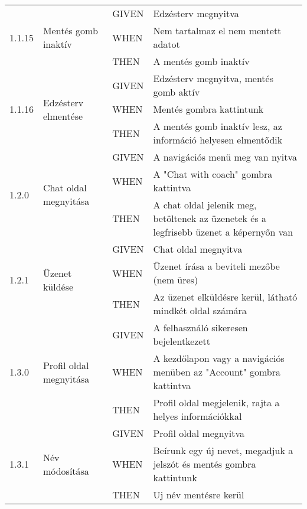 \begin{center}
\begin{longtable}{ | p{} | p{} | p{} | p{} | }
			\multirow{3}{*}{1.1.15} 
			& \multirow{3}{=}{Mentés gomb inaktív} 
			& GIVEN 
			& Edzésterv megnyitva \\
			\cline{3-4}
			& & WHEN 
			& Nem tartalmaz el nem mentett adatot \\
			\cline{3-4}
			& & THEN 
			& A mentés gomb inaktív \\
			\hline

			\multirow{3}{*}{1.1.16} 
			& \multirow{3}{=}{Edzésterv elmentése} 
			& GIVEN 
			& Edzésterv megnyitva, mentés gomb aktív \\
			\cline{3-4}
			& & WHEN 
			& Mentés gombra kattintunk \\
			\cline{3-4}
			& & THEN 
			& A mentés gomb inaktív lesz, az információ helyesen elmentődik \\
			\hline



			\multirow{3}{*}{1.2.0} 
			& \multirow{3}{=}{Chat oldal megnyitása} 
			& GIVEN 
			& A navigációs menü meg van nyitva \\
			\cline{3-4}
			& & WHEN 
			& A "Chat with coach" gombra kattintva \\
			\cline{3-4}
			& & THEN 
			& A chat oldal jelenik meg, betöltenek az üzenetek és a legfrisebb üzenet a képernyőn van \\
			\hline

			\multirow{3}{*}{1.2.1} 
			& \multirow{3}{=}{Üzenet küldése} 
			& GIVEN 
			& Chat oldal megnyitva \\
			\cline{3-4}
			& & WHEN 
			& Üzenet írása a beviteli mezőbe (nem üres) \\
			\cline{3-4}
			& & THEN 
			& Az üzenet elküldésre kerül, látható mindkét oldal számára \\
			\hline







			\multirow{3}{*}{1.3.0} 
			& \multirow{3}{=}{Profil oldal megnyitása} 
			& GIVEN 
			& A felhasználó sikeresen bejelentkezett \\
			\cline{3-4}
			& & WHEN 
			& A kezdőlapon vagy a navigációs menüben az "Account" gombra kattintva \\
			\cline{3-4}
			& & THEN 
			& Profil oldal megjelenik, rajta a helyes információkkal \\
			\hline

			\multirow{3}{*}{1.3.1} 
			& \multirow{3}{=}{Név módosítása} 
			& GIVEN 
			& Profil oldal megnyitva \\
			\cline{3-4}
			& & WHEN 
			& Beírunk egy új nevet, megadjuk a jelszót és mentés gombra kattintunk \\
			\cline{3-4}
			& & THEN 
			& Uj név mentésre kerül \\
			\hline


\end{longtable}
\end{center}
